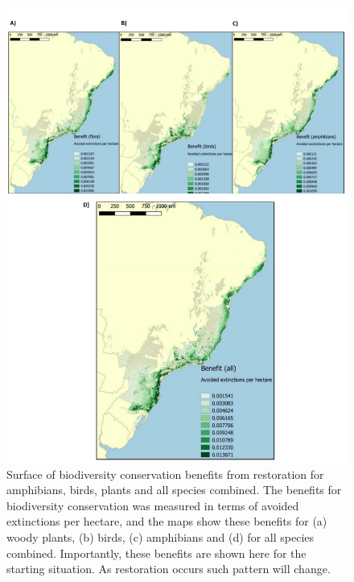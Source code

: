 \newpage
\begin{figure}[H]
\includegraphics[width=1.0\linewidth]{pictureve/Bio-Extinct-2.pdf}
\caption{Surface of biodiversity conservation benefits from restoration for amphibians, birds, plants and all species combined. The benefits for biodiversity conservation was measured in terms of avoided extinctions per hectare, and the maps show these benefits for (a) woody plants, (b) birds, (c) amphibians and (d) for all species combined. Importantly, these benefits are shown here for the starting situation. As restoration occurs such pattern will change.}
\label{fig:Bio-Extinct-2}
\end{figure}







